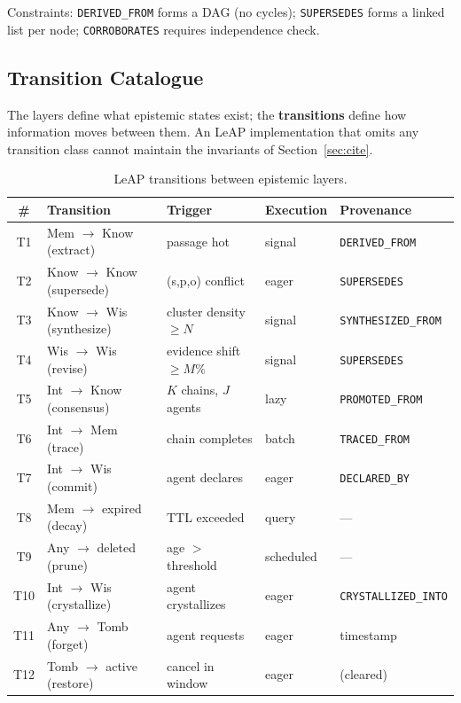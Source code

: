 \documentclass[11pt,letterpaper]{article}
\begin{document}
Constraints: \texttt{DERIVED\_FROM} forms a DAG (no cycles); \texttt{SUPERSEDES} forms a linked list per node; \texttt{CORROBORATES} requires independence check.

\subsection{Transition Catalogue}

The layers define what epistemic states exist; the \textbf{transitions} define how information moves between them. An LeAP implementation that omits any transition class cannot maintain the invariants of Section~\ref{sec:cite}.

\begin{table}[H]
\centering
\caption{LeAP transitions between epistemic layers.}
\label{tab:transitions}
\begin{tabular}{@{}clllp{3.8cm}@{}}
\toprule
\textbf{\#} & \textbf{Transition} & \textbf{Trigger} & \textbf{Execution} & \textbf{Provenance} \\
\midrule
T1 & Mem $\to$ Know (extract) & passage hot & signal & \texttt{DERIVED\_FROM} \\
T2 & Know $\to$ Know (supersede) & (s,p,o) conflict & eager & \texttt{SUPERSEDES} \\
T3 & Know $\to$ Wis (synthesize) & cluster density $\geq N$ & signal & \texttt{SYNTHESIZED\_FROM} \\
T4 & Wis $\to$ Wis (revise) & evidence shift $\geq M\%$ & signal & \texttt{SUPERSEDES} \\
T5 & Int $\to$ Know (consensus) & $K$ chains, $J$ agents & lazy & \texttt{PROMOTED\_FROM} \\
T6 & Int $\to$ Mem (trace) & chain completes & batch & \texttt{TRACED\_FROM} \\
T7 & Int $\to$ Wis (commit) & agent declares & eager & \texttt{DECLARED\_BY} \\
T8 & Mem $\to$ expired (decay) & TTL exceeded & query & --- \\
T9 & Any $\to$ deleted (prune) & age $>$ threshold & scheduled & --- \\
T10 & Int $\to$ Wis (crystallize) & agent crystallizes & eager & \texttt{CRYSTALLIZED\_INTO} \\
T11 & Any $\to$ Tomb (forget) & agent requests & eager & timestamp \\
T12 & Tomb $\to$ active (restore) & cancel in window & eager & (cleared) \\
\bottomrule
\end{tabular}
\end{table}
\end{document}
